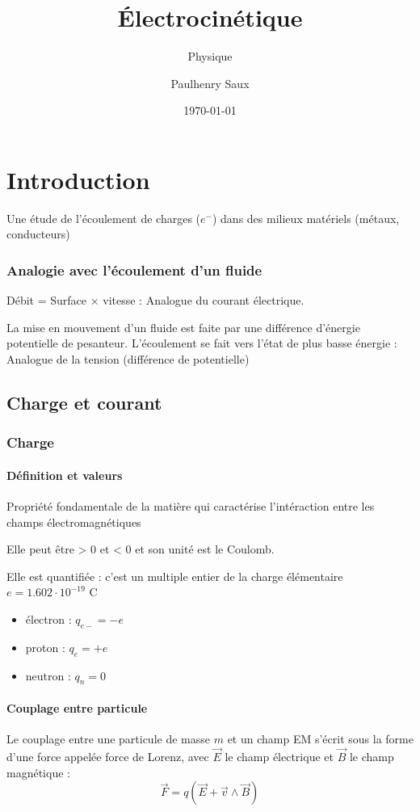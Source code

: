 \documentclass[french]{yLectureNote}
\title{Électrocinétique}
\subtitle{Physique}
\author{Paulhenry Saux}
\date{\today}
\renewcommand{\vec}{\overrightarrow}
\begin{document}
	\chapter{Introduction}
\begin{definition}
Une étude de l'écoulement de charges ($e^-$) dans des milieux matériels (métaux, conducteurs)
\end{definition}
\subsection{Analogie avec l'écoulement d'un fluide}
Débit = Surface $\times$ vitesse : Analogue du courant électrique.

La mise en mouvement d'un fluide est faite par une différence d'énergie potentielle de pesanteur. L'écoulement se fait vers l'état de plus basse énergie : Analogue de la tension (différence de potentielle)
\section{Charge et courant}
\subsection{Charge}
\subsubsection{Définition et valeurs}
\begin{definition}
Propriété fondamentale de la matière qui caractérise l'intéraction entre les champs électromagnétiques

Elle peut \^etre > 0 et < 0 et son unité est le Coulomb.

Elle est quantifiée : c'est un multiple entier de la charge élémentaire \(e  = 1.602\cdot 10^{-19}\) C
\end{definition}
\begin{itemize}
 \item électron : $q_{e-} = -e$
 \item proton : $q_{e} = +e$
 \item neutron : $q_n = 0$
\end{itemize}
\subsubsection{Couplage entre particule}
Le couplage entre une particule de masse $m$ et un champ EM s'écrit sous la forme d'une force appelée force de Lorenz, avec \(\vec{E}\) le champ électrique et \(\vec{B}\) le champ magnétique : \[\vec{F} = q(\vec{E} + \vec{v} \wedge \vec{B})\]
\end{document}
